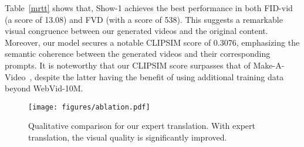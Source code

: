 \documentclass{article} \usepackage{iclr2024_conference,times}
\begin{document}
Table~\ref{mrtt} shows that, Show-1  achieves the best performance in both FID-vid (a score of 13.08) and FVD (with a score of 538). This suggests a remarkable visual congruence between our generated videos and the original content. Moreover, our model secures a notable CLIPSIM score of 0.3076, emphasizing the semantic coherence between the generated videos and their corresponding prompts. It is noteworthy that our CLIPSIM score surpasses that of Make-A-Video~\citep{singer2022make}, despite the latter having the benefit of using additional training data beyond WebVid-10M.
\begin{table}[t]
\centering
\caption{Human evaluation on  state-of-the-art open-sourced text-to-video models.}
 \centering
\label{human}
\end{table} 

\begin{table}[t]
\centering
\caption{Comparisons of different combinations of pixel-based and latent-based VDMs in terms of text-video similarity and memory usage during inference.}
 \centering
\label{ablation1}
\end{table} \begin{figure}[t!]
    \centering
    \texttt{[image: figures/ablation.pdf]}
    \caption{Qualitative comparison for our expert translation. With expert translation, the visual quality is significantly improved.}
    \label{fig:compare_2}
\end{figure}
\end{document}
